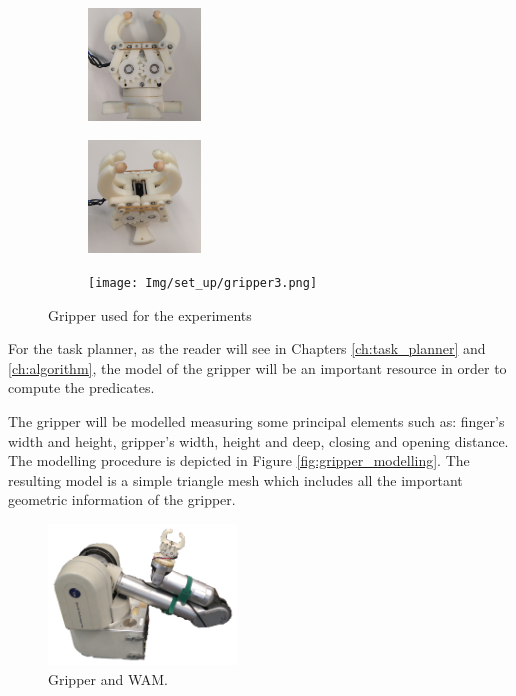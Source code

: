 \begin{figure}[htp]
\centering
\begin{subfigure}[b]{0.3\textwidth}
\centering
\includegraphics[height=3cm]{Img/set_up/gripper1.png}
\end{subfigure}
\begin{subfigure}[b]{0.3\textwidth}
\centering
\includegraphics[height=3cm]{Img/set_up/gripper2.png}
\end{subfigure}
\begin{subfigure}[b]{0.3\textwidth}
\centering
\texttt{[image: Img/set\_up/gripper3.png]}
\end{subfigure}
\caption{Gripper used for the experiments}\label{fig:gripper_general}
\end{figure}

For the task planner, as the reader will see in Chapters \ref{ch:task_planner} and \ref{ch:algorithm}, the model of the gripper will be an important resource 
in order to compute the predicates. 

The gripper will be modelled measuring some principal elements such as: finger's width and height, gripper's width, height and deep, closing and opening distance. The modelling procedure is depicted in Figure \ref{fig:gripper_modelling}. The resulting model is a simple triangle mesh which includes all the important geometric information of the gripper.

\begin{figure}
\caption{Gripper and WAM.}\label{fig:wam_gripper}
\includegraphics[width=5.0cm]{Img/set_up/wam_gripper2.png}
\end{figure}

